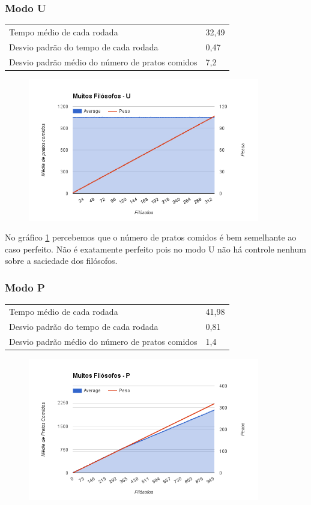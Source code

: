 \documentclass[paper=a4, fontsize=11pt]{scrartcl}
\numberwithin{equation}{section}		%
\numberwithin{figure}{section}			%
\numberwithin{table}{section}				%
\begin{document}
\subsubsection{Modo U}
\begin{tabular}{ll}
	Tempo médio de cada rodada& 32,49\\
	Desvio padrão do tempo de cada rodada& 0,47\\
	Desvio padrão médio do número de pratos comidos& 7,2\\
\end{tabular}

\begin{figure}[H]
	\centering
	\includegraphics[width=0.9\textwidth]{image7}
	\caption{}
	\label{image7}
\end{figure}

No gráfico \ref{image7} percebemos que o número de pratos comidos é bem semelhante ao caso perfeito. Não é exatamente perfeito pois no modo U não há controle nenhum sobre a saciedade dos filósofos.

\pagebreak
\subsubsection{Modo P}
\begin{tabular}{ll}
	Tempo médio de cada rodada& 41,98\\
	Desvio padrão do tempo de cada rodada& 0,81\\
	Desvio padrão médio do número de pratos comidos& 1,4\\
\end{tabular}

\begin{figure}[H]
	\centering
	\includegraphics[width=0.9\textwidth]{image8}
	\caption{}
	\label{image8}
\end{figure}
\end{document}
